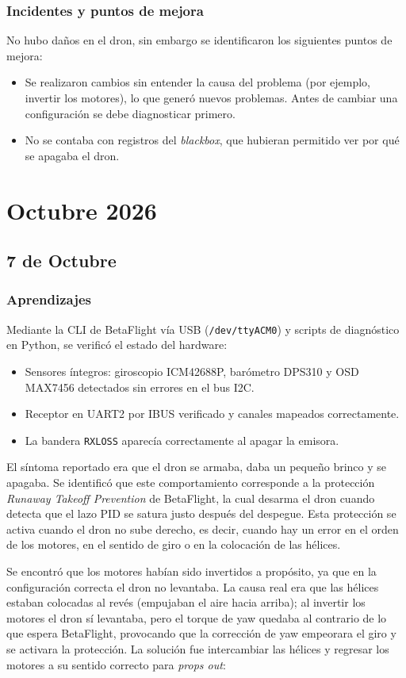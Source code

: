 \documentclass[pdflatex,sn-mathphys-num]{sn-jnl}%
\begin{document}
\subsubsection{Incidentes y puntos de mejora}
No hubo daños en el dron, sin embargo se identificaron los siguientes puntos de mejora:
\begin{itemize}
    \item Se realizaron cambios sin entender la causa del problema (por ejemplo, invertir los motores), lo que generó nuevos problemas. Antes de cambiar una configuración se debe diagnosticar primero.
    \item No se contaba con registros del \textit{blackbox}, que hubieran permitido ver por qué se apagaba el dron.
\end{itemize}

\section{Octubre 2026}
\subsection{7 de Octubre}
\subsubsection{Aprendizajes}
Mediante la CLI de BetaFlight vía USB (\texttt{/dev/ttyACM0}) y scripts de diagnóstico en Python, se verificó el estado del hardware:
\begin{itemize}
    \item Sensores íntegros: giroscopio ICM42688P, barómetro DPS310 y OSD MAX7456 detectados sin errores en el bus I2C.
    \item Receptor en UART2 por IBUS verificado y canales mapeados correctamente.
    \item La bandera \texttt{RXLOSS} aparecía correctamente al apagar la emisora.
\end{itemize}

El síntoma reportado era que el dron se armaba, daba un pequeño brinco y se apagaba. Se identificó que este comportamiento corresponde a la protección \textit{Runaway Takeoff Prevention} de BetaFlight, la cual desarma el dron cuando detecta que el lazo PID se satura justo después del despegue. Esta protección se activa cuando el dron no sube derecho, es decir, cuando hay un error en el orden de los motores, en el sentido de giro o en la colocación de las hélices.

Se encontró que los motores habían sido invertidos a propósito, ya que en la configuración correcta el dron no levantaba. La causa real era que las hélices estaban colocadas al revés (empujaban el aire hacia arriba); al invertir los motores el dron sí levantaba, pero el torque de yaw quedaba al contrario de lo que espera BetaFlight, provocando que la corrección de yaw empeorara el giro y se activara la protección. La solución fue intercambiar las hélices y regresar los motores a su sentido correcto para \textit{props out}:
\end{document}
